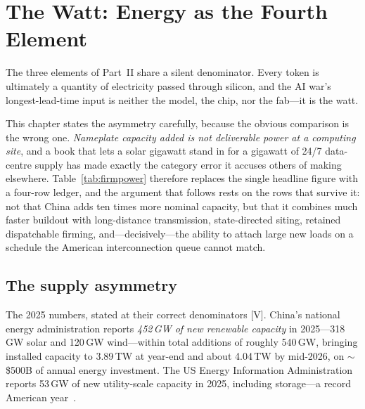 \chapter{The Watt: Energy as the Fourth Element}
\label{ch:energy}

The three elements of Part~II share a silent denominator. Every token is ultimately a quantity of electricity passed through silicon, and the AI war's longest-lead-time input is neither the model, the chip, nor the fab---it is the watt.

This chapter states the asymmetry carefully, because the obvious comparison is the wrong one. \emph{Nameplate capacity added is not deliverable power at a computing site}, and a book that lets a solar gigawatt stand in for a gigawatt of 24/7 data-centre supply has made exactly the category error it accuses others of making elsewhere. Table~\ref{tab:firmpower} therefore replaces the single headline figure with a four-row ledger, and the argument that follows rests on the rows that survive it: not that China adds ten times more nominal capacity, but that it combines much faster buildout with long-distance transmission, state-directed siting, retained dispatchable firming, and---decisively---the ability to attach large new loads on a schedule the American interconnection queue cannot match.

\section{The supply asymmetry}

The 2025 numbers, stated at their correct denominators [V]. China's national energy administration reports \emph{452\,GW of new renewable capacity} in 2025---318\,GW solar and 120\,GW wind---within total additions of roughly 540\,GW, bringing installed capacity to 3.89\,TW at year-end and about 4.04\,TW by mid-2026, on $\sim$\$500B of annual energy investment. The US Energy Information Administration reports 53\,GW of new utility-scale capacity in 2025, including storage---a record American year~\cite{china-capacity,us-additions,nea-2025}.

